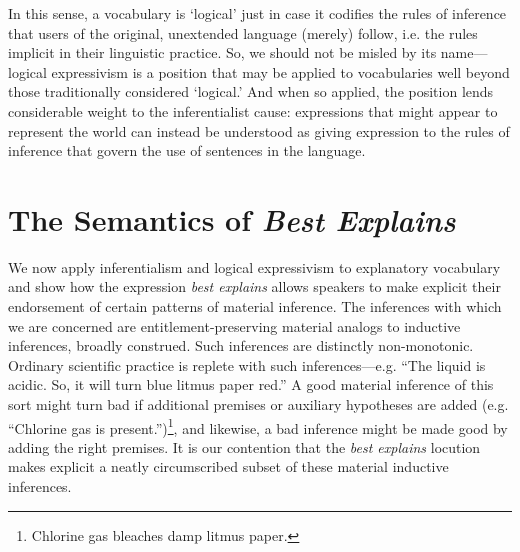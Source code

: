\documentclass{article}
\begin{document}
In this sense, a vocabulary is `logical' just in case it codifies the rules of inference that users of the original, unextended language (merely) follow, i.e. the rules implicit in their linguistic practice.  So, we should not be misled by its name---logical expressivism is a position that may be applied to vocabularies well beyond those traditionally considered `logical.' And when so applied, the position lends considerable weight to the inferentialist cause: expressions that might appear to represent the world can instead be understood as giving expression to the rules of inference that govern the use of sentences in the language.  




\section{The Semantics of \textit{Best Explains}}
We now apply inferentialism and logical expressivism to explanatory vocabulary and show how the expression \textit{best explains} allows speakers to make explicit their endorsement of certain patterns of material inference. The inferences with which we are concerned are entitlement-preserving material analogs to inductive inferences, broadly construed. Such inferences are distinctly non-monotonic. Ordinary scientific practice is replete with such inferences---e.g. ``The liquid is acidic. So, it will turn blue litmus paper red.'' A good material inference of this sort might turn bad if additional premises or auxiliary hypotheses are added (e.g. ``Chlorine gas is present.'')\footnote{Chlorine gas bleaches damp litmus paper.}, and likewise, a bad inference might be made good by adding the right premises. It is our contention that the \textit{best explains} locution makes explicit a neatly circumscribed subset of these material inductive inferences. 
\end{document}
